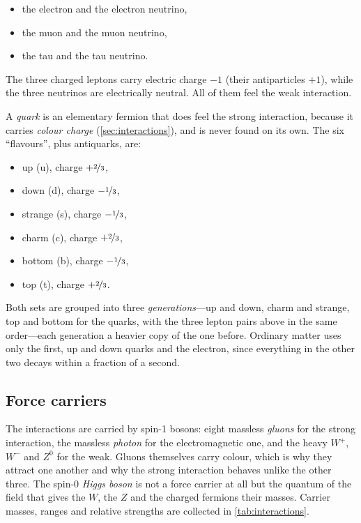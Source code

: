         \begin{itemize}
            \item the electron and the electron neutrino,
            \item the muon and the muon neutrino,
            \item the tau and the tau neutrino.
        \end{itemize}

        The three charged leptons carry electric charge $-1$ (their antiparticles $+1$), while the three neutrinos are electrically neutral. All of them feel the weak interaction.

        A \emph{quark} is an elementary fermion that does feel the strong interaction, because it carries \emph{colour charge} (\cref{sec:interactions}), and is never found on its own. The six \enquote{flavours}, plus antiquarks, are:

        \begin{itemize}
            \item up (u), charge $+\nicefrac{2}{3}$,
            \item down (d), charge $-\nicefrac{1}{3}$,
            \item strange (s), charge $-\nicefrac{1}{3}$,
            \item charm (c), charge $+\nicefrac{2}{3}$,
            \item bottom (b), charge $-\nicefrac{1}{3}$,
            \item top (t), charge $+\nicefrac{2}{3}$.
        \end{itemize}

        Both sets are grouped into three \emph{generations}---up and down, charm and strange, top and bottom for the quarks, with the three lepton pairs above in the same order---each generation a heavier copy of the one before. Ordinary matter uses only the first, up and down quarks and the electron, since everything in the other two decays within a fraction of a second.

    \subsection{Force carriers}

        The interactions are carried by spin-1 bosons: eight massless \emph{gluons} for the strong interaction, the massless \emph{photon} for the electromagnetic one, and the heavy $W^{+}$, $W^{-}$ and $Z^{0}$ for the weak. Gluons themselves carry colour, which is why they attract one another and why the strong interaction behaves unlike the other three. The spin-0 \emph{Higgs boson} is not a force carrier at all but the quantum of the field that gives the $W$, the $Z$ and the charged fermions their masses. Carrier masses, ranges and relative strengths are collected in \cref{tab:interactions}.


